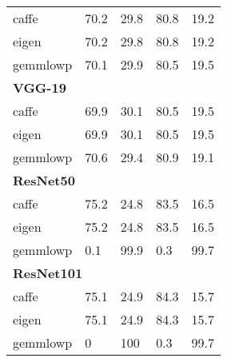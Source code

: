 \begin{table}[]
\begin{tabular}{lllll}
caffe                & 70.2                         & 29.8                 & 80.8                         & 19.2                 \\
eigen                & 70.2                         & 29.8                 & 80.8                         & 19.2                 \\
gemmlowp             & 70.1                         & 29.9                 & 80.5                         & 19.5                 \\
\multicolumn{5}{l}{\textbf{VGG-19}}                                                                                              \\
caffe                & 69.9                         & 30.1                 & 80.5                         & 19.5                 \\
eigen                & 69.9                         & 30.1                 & 80.5                         & 19.5                 \\
gemmlowp             & 70.6                         & 29.4                 & 80.9                         & 19.1                 \\
\multicolumn{5}{l}{\textbf{ResNet50}}                                                                                            \\
caffe                & 75.2                         & 24.8                 & 83.5                         & 16.5                 \\
eigen                & 75.2                         & 24.8                 & 83.5                         & 16.5                 \\
gemmlowp             & 0.1                          & 99.9                 & 0.3                          & 99.7                 \\
\multicolumn{5}{l}{\textbf{ResNet101}}                                                                                           \\
caffe                & 75.1                         & 24.9                 & 84.3                         & 15.7                 \\
eigen                & 75.1                         & 24.9                 & 84.3                         & 15.7                 \\
gemmlowp             & 0                            & 100                  & 0.3                          & 99.7                
\end{tabular}
\end{table}

